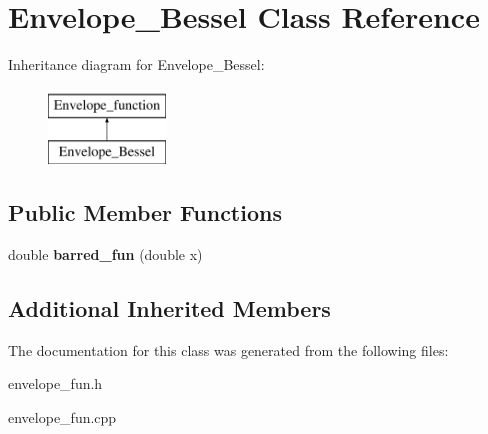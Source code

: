 \hypertarget{classEnvelope__Bessel}{}\section{Envelope\+\_\+\+Bessel Class Reference}
\label{classEnvelope__Bessel}
Inheritance diagram for Envelope\+\_\+\+Bessel\+:\begin{figure}[H]
\begin{center}
\leavevmode
\includegraphics[height=2.000000cm]{classEnvelope__Bessel}
\end{center}
\end{figure}
\subsection*{Public Member Functions}
\begin{DoxyCompactItemize}
\item 
\mbox{\label{classEnvelope__Bessel_a6089657c26937fc1c9d8801207577a38}} 
double {\bfseries barred\+\_\+fun} (double x)
\end{DoxyCompactItemize}
\subsection*{Additional Inherited Members}


The documentation for this class was generated from the following files\+:\begin{DoxyCompactItemize}
\item 
envelope\+\_\+fun.\+h\item 
envelope\+\_\+fun.\+cpp\end{DoxyCompactItemize}
